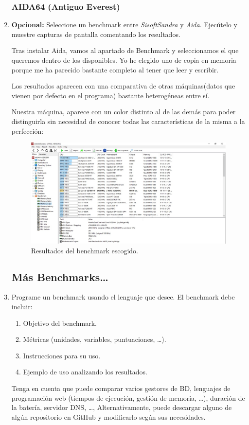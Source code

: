\documentclass[paper=a4, fontsize=11pt]{scrartcl} %
\numberwithin{equation}{section} %
\numberwithin{figure}{section} %
\numberwithin{table}{section} %
\begin{document}
\begin{enumerate}
	\subsubsection{AIDA64 (Antiguo Everest)}
		\item \textbf{Opcional:} Seleccione un benchmark entre \textit{SisoftSandra} y \textit{Aida}.
		Ejecútelo y muestre capturas de pantalla comentando los resultados.
		
		Tras instalar Aida, vamos al apartado de Benchmark y seleccionamos el que queremos dentro de
		los disponibles. Yo he elegido uno de copia en memoria porque me ha parecido bastante completo
		al tener que leer y escribir.
		
		Los resultados aparecen con una comparativa de otras máquinas(datos que vienen por defecto en
		el programa) bastante heterogéneas entre sí.
		
		Nuestra máquina, aparece con un color distinto al de las demás para poder distinguirla sin
		necesidad de conocer todas las características de la misma a la perfección:
		
		\begin{figure}[H]
			\centering
			\includegraphics[width=15cm]{Ejercicio_8.jpg}
			\caption{Resultados del benchmark escogido.}
			\label{fig:Aida}
		\end{figure}
		
	\subsection{Más Benchmarks\dots}
		\item Programe un benchmark usando el lenguaje que desee. El benchmark debe incluir:
		\begin{enumerate}
			\item Objetivo del benchmark.
			\item Métricas (unidades, variables, puntuaciones, \dots).
			\item Instrucciones para su uso.
			\item Ejemplo de uso analizando los resultados.
		\end{enumerate}
		Tenga en cuenta que puede comparar varios gestores de BD, lenguajes de programación web (tiempos
		de ejecución, gestión de memoria, \dots), duración de la batería, servidor DNS, \dots,
		Alternativamente, puede descargar alguno de algún repositorio en GitHub y modificarlo según sus
		necesidades.
		

\end{enumerate}
\end{document}
